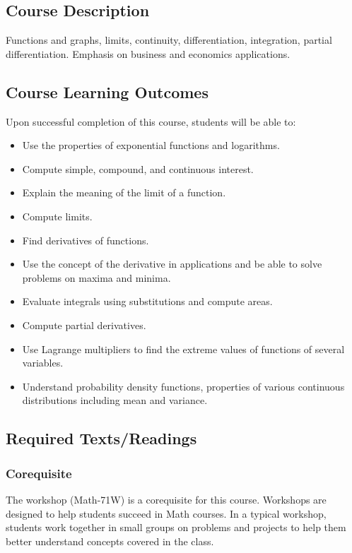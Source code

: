 \documentclass[letterpaper,12pt,fleqn]{article}
\begin{document}
\subsection*{Course Description}

Functions and graphs, limits, continuity, differentiation, integration, partial differentiation. Emphasis on business and
economics applications.

\subsection*{Course Learning Outcomes}

Upon successful completion of this course, students will be able to:
\begin{itemize}
\item Use the properties of exponential functions and logarithms.
\item Compute simple, compound, and continuous interest.
\item Explain the meaning of the limit of a function.
\item Compute limits.
\item Find derivatives of functions.
\item Use the concept of the derivative in applications and be able to solve problems on maxima and minima.
\item Evaluate integrals using substitutions and compute areas.
\item Compute partial derivatives.
\item Use Lagrange multipliers to find the extreme values of functions of several variables.
\item Understand probability density functions, properties of various continuous distributions including mean and
  variance.
\end{itemize}

\subsection*{Required Texts/Readings}

\subsubsection*{Corequisite}

The workshop (Math-71W) is a corequisite for this course.  Workshops are designed to help students succeed in Math courses.
In a typical workshop, students work together in small groups on problems and projects to help them better understand
concepts covered in the class.
\end{document}
